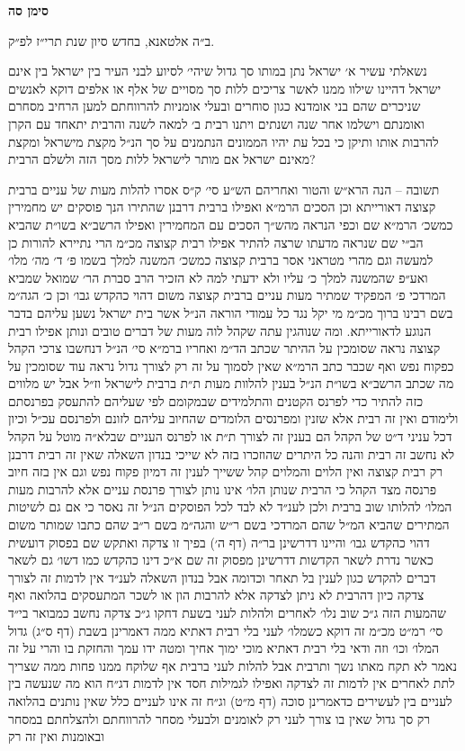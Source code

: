 \documentclass[12pt, openany]{book}
\newcommand{\chapname}{}
\newcommand{\newchap}[1]{
	\addcontentsline{toc}{chapter}{#1}
	\renewcommand{\chapname}{#1}
		\begin{center}
			\textbf{%
\fontsize{16pt}{16pt}\selectfont
				#1}
		\end{center}
}
\begin{document}
\newchap{סימן סה}
\begin{multicols}{2}
ב״ה אלטאנא, בחדש סיון שנת תרי״ז לפ״ק.\\\vspace{0pt}

נשאלתי עשיר א׳ ישראל נתן במותו סך גדול שיהי׳ לסיוע לבני העיר בין ישראל בין אינם ישראל דהיינו שילוו ממנו לאשר צריכים ללות סך מסויים של אלף או אלפים דוקא לאנשים שניכרים שהם בני אומדנא כגון סוחרים ובעלי אומניות להרווחתם למען הרחיב מסחרם ואומנתם וישלמו אחר שנה ושנתים ויתנו רבית ב׳ למאה לשנה והרבית יתאחד עם הקרן להרבות אותו ותיקן כי בכל עת יהיו הממונים הנתמנים על סך הנ״ל מקצת מישראל ומקצת מאינם ישראל אם מותר לישראל ללות מסך הזה ולשלם הרבית?\\\vspace{0pt}

תשובה – הנה הרא״ש והטור ואחריהם הש״ע סי׳ ק״ס אסרו להלות מעות של עניים ברבית קצוצה דאורייתא וכן הסכים הרמ״א ואפילו ברבית דרבנן שהתירו הנך פוסקים יש מחמירין כמשכ׳ הרמ״א שם וכפי הנראה מהש״ך הסכים עם המחמירין ואפילו הרשב״א בשו״ת שהביא הב״י שם שנראה מדעתו שרצה להתיר אפילו רבית קצוצה מכ״מ הרי נתיירא להורות כן למעשה וגם מהרי מטראני אסר ברבית קצוצה כמשכ׳ המשנה למלך בשמו פ׳ ד׳ מה׳ מלו׳ ואע״פ שהמשנה למלך כ׳ עליו ולא ידעתי למה לא הזכיר הרב סברת הר׳ שמואל שמביא המרדכי פ׳ המפקיד שמתיר מעות עניים ברבית קצוצה משום דהוי כהקדש גבו׳ וכן כ׳ הגה״מ בשם רבינו ברוך מכ״מ מי יקל נגד כל עמודי הוראה הנ״ל אשר בית ישראל נשען עליהם בדבר הנוגע לדאורייתא. ומה שנוהגין עתה שקהל לוה מעות של דברים טובים ונותן אפילו רבית קצוצה נראה שסומכין על ההיתר שכתב הד״מ ואחריו ברמ״א סי׳ הנ״ל דנחשבו צרכי הקהל כפקוח נפש ואף שכבר כתב הרמ״א שאין לסמוך על זה רק לצורך גדול נראה עוד שסומכין על מה שכתב הרשב״א בשו״ת הנ״ל בענין להלוות מעות ת״ת ברבית לישראל וז״ל אבל יש מלווים כזה להתיר כדי לפרנס הקטנים והתלמידים שבמקומם לפי שעליהם להתעסק בפרנסתם ולימודם ואין זה רבית אלא שזנין ומפרנסים הלומדים שהחיוב עליהם לזונם ולפרנסם עכ״ל וכיון דכל עניני ד״ט של הקהל הם בענין זה לצורך ת״ת או לפרנס העניים שבלא״ה מוטל על הקהל לא נחשב זה רבית והנה כל היתרים שהוזכרו בזה לא שייכי בנדון השאלה שאין זה רבית דרבנן רק רבית קצוצה ואין הלוים והמלוים קהל ששייך לענין זה דמיון פקוח נפש וגם אין בזה חיוב פרנסה מצד הקהל כי הרבית שנותן הלו׳ אינו נותן לצורך פרנסת עניים אלא להרבות מעות המלו׳ להלותו שוב ברבית ולכן לענ״ד לא לבד לכל הפוסקים הנ״ל זה נאסר כי אם גם לשיטות המתירים שהביא המ״ל שהם המרדכי בשם ר״ש והגה״מ בשם ר״ב שהם כתבו שמותר משום דהוי כהקדש גבו׳ והיינו דדרשינן בר״ה (דף ה׳) בפיך זו צדקה ואתקש שם בפסוק דועשית כאשר נדרת לשאר הקדשות דדרשינן מפסוק זה שם א״כ דינו כהקדש כמו דשו׳ גם לשאר דברים להקדש כגון לענין בל תאחר וכדומה אבל בנדון השאלה לענ״ד אין לדמות זה לצורך צדקה כיון דהרבית לא ניתן לצדקה אלא להרבות הון או לשכר המתעסקים בהלואה ואף שהמעות הזה ג״כ שוב נלו׳ לאחרים ולהלות לעני בשעת דחקו ג״כ צדקה נחשב כמבואר בי״ד סי׳ רמ״ט מכ״מ זה דוקא כשמלו׳ לעני בלי רבית דאתיא ממה דאמרינן בשבת (דף ס״ג) גדול המלו׳ וכו׳ וזה ודאי בלי רבית דאתיא מוכי ימוך אחיך ומטה ידו עמך והחזקת בו והרי על זה נאמר לא תקח מאתו נשך ותרבית אבל להלות לעני ברבית אף שלוקח ממנו פחות ממה שצריך לתת לאחרים אין לדמות זה לצדקה ואפילו לגמילות חסד אין לדמות דג״ח הוא מה שנעשה בין לעניים בין לעשירים כדאמרינן סוכה (דף מ״ט) וג״ח זה אינו לעניים כלל שאין נותנים בהלואה רק סך גדול שאין בו צורך לעני רק לאומנים ולבעלי מסחר להרווחתם ולהצלחתם במסחר ובאומנות ואין זה רק 
\end{multicols}
\end{document}
